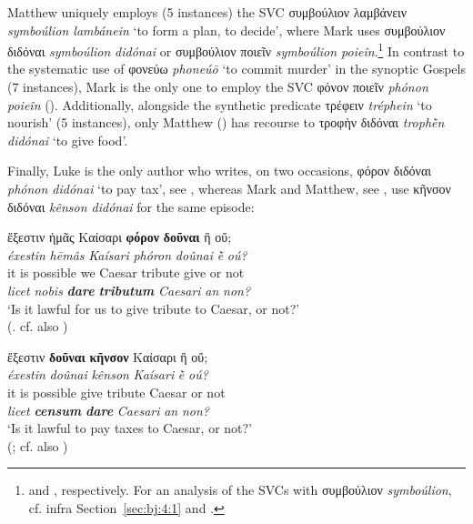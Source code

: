 \documentclass[output=paper,colorlinks,citecolor=brown]{langscibook}
\begin{document}
\z

Matthew uniquely employs (5 instances) the SVC συμβούλιον λαμβάνειν \emph{symboúlion
  lambánein} `to form a plan, to decide', where Mark uses συμβούλιον διδόναι
\emph{symboúlion} \emph{didónai} or συμβούλιον ποιεῖν \emph{symboúlion
  poieîn}.\footnote{ and , respectively. For an analysis of the SVCs with
  συμβούλιον \emph{symboúlion}, cf. infra Section~\ref{sec:bj:4:1} and \citet{JiménezLópez2017}.} In
contrast to the systematic use of φονεύω \emph{phoneúō} `to commit murder' in the
synoptic Gospels (7 instances), Mark is the only one to employ the SVC φόνον ποιεῖν
\emph{phónon poieîn} (). Additionally, alongside the synthetic predicate
τρέφειν \emph{tréphein} `to nourish' (5 instances), only Matthew () has
recourse to τροφὴν διδόναι \emph{trophḕn didónai} `to give food'.




Finally, Luke is the only author who writes, on two occasions, φόρον διδόναι \emph{phónon
  didónai} `to pay tax', see , whereas Mark and Matthew, see , use
κῆνσον διδόναι \emph{kênson didónai} for the same episode:

\ea\label{ex:bj:12}

\ea\label{ex:bj:12a}

\gllll ἔξεστιν ἡμᾶς Καίσαρι \textbf{φόρον} \textbf{δοῦναι} ἢ οὔ;\\
 \textit{éxestin} \textit{hēmâs} \textit{Kaísari} \textit{phóron} \textit{doûnai} \textit{ḕ} \textit{oú?}\\
{it is possible} we Caesar tribute give or not\\
\emph{licet} \emph{nobis} \textbf{\itshape dare} \textbf{\itshape tributum} \emph{Caesari} \emph{an} \emph{non?}\\
\glt `Is it lawful for us to give tribute to Caesar, or not?' \\
\hspace*{\fill}(. cf. also )

\ex\label{ex:bj:12b}

\gllll ἔξεστιν \textbf{δοῦναι} \textbf{κῆνσον} Καίσαρι ἢ οὔ;\\
 \textit{éxestin} \textit{doûnai} \textit{kênson} \textit{Kaísari} \textit{ḕ} \textit{oú?}\\
{it is possible} give tribute Caesar or not\\
\emph{licet} \textbf{\itshape censum} \textbf{\itshape dare} \emph{Caesari} \emph{an} \emph{non?}\\
\glt `Is it lawful to pay taxes to Caesar, or not?' \\
\hspace*{\fill}(; cf. also )
\end{document}
